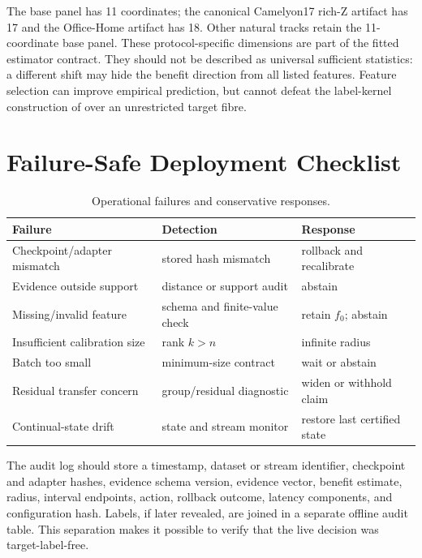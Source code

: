 The base panel has 11 coordinates; the canonical Camelyon17 rich-Z artifact has 17 and the
Office-Home artifact has 18. Other natural tracks retain the 11-coordinate base panel. These
protocol-specific dimensions are part of the fitted estimator contract. They should not be described as
universal sufficient statistics: a different shift may hide the benefit direction from all listed features. Feature
selection can improve empirical prediction, but cannot defeat the label-kernel construction of
 over an unrestricted target fibre.

\section{Failure-Safe Deployment Checklist}
\label{app:compact-deployment}

\begin{table}[t]
\centering
\scriptsize
\caption{Operational failures and conservative responses.}
\label{tab:compact-failures}
\begin{tabular}{@{}p{}p{}p{}@{}}
\toprule
Failure & Detection & Response \\
\midrule
Checkpoint/adapter mismatch & stored hash mismatch & rollback and recalibrate \\
Evidence outside support & distance or support audit & abstain \\
Missing/invalid feature & schema and finite-value check & retain $f_0$; abstain \\
Insufficient calibration size & rank $k>n$ & infinite radius \\
Batch too small & minimum-size contract & wait or abstain \\
Residual transfer concern & group/residual diagnostic & widen or withhold claim \\
Continual-state drift & state and stream monitor & restore last certified state \\
\bottomrule
\end{tabular}
\end{table}

The audit log should store a timestamp, dataset or stream identifier, checkpoint and adapter hashes,
evidence schema version, evidence vector, benefit estimate, radius, interval endpoints, action,
rollback outcome, latency components, and configuration hash. Labels, if later revealed, are joined
in a separate offline audit table. This separation makes it possible to verify that the live
decision was target-label-free.

